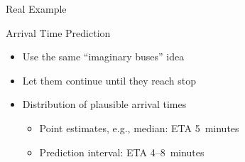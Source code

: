 \documentclass[10pt,t]{beamer}
\begin{document}
{ %
    \begin{frame}{Real Example}
     \end{frame}
}



\begin{frame}{Arrival Time Prediction}
  \pause
  \begin{itemize}[<+->]
  \item Use the same ``imaginary buses'' idea

  \item Let them continue until they reach stop

  \item Distribution of plausible arrival times
    \begin{itemize}
    \item Point estimates, e.g., median: ETA 5~minutes
    \item Prediction interval: ETA 4--8~minutes
    \end{itemize}
  \end{itemize}



\end{frame}
\end{document}
